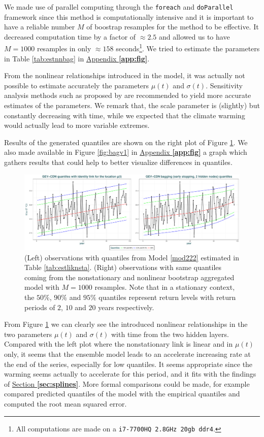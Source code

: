  We made use of parallel computing through the \texttt{foreach} and \texttt{doParallel} framework since this method is computationally intensive and it is important to have a reliable number $M$ of boostrap resamples for the method to be effective. It decreased computation time by a factor of $\approx 2.5$ and allowed us to have $M=1000$ resamples in only $\approx 158$ seconds\footnote{All computations are made on a \texttt{i7-7700HQ 2.8GHz 20gb ddr4}.}. We tried to estimate the parameters in Table \ref{tab:estnnbag} in \hyperref[app:fig]{Appendix \textbf{\ref{app:fig}}}.
 

 From the nonlinear relationships introduced in the model, it was actually not possible to estimate accurately the parameters $\mu(t)$ and $\sigma(t)$. Sensitivity analysis methods such as proposed by \citet{cannon_graph_2002} are recommended to yield more accurate estimates of the parameters.
 We remark that, the scale parameter is (slightly) but constantly decreasing with time, while we expected that the climate warming would actually lead to more variable extremes.
 
 Results of the generated quantiles are shown on the right plot of Figure \ref{fig:bag}. We also made available in Figure \ref{fig:bagv1} in  \hyperref[app:fig]{Appendix \textbf{\ref{app:fig}}} a graph which gathers results that could help to better visualize differences in quantiles. 
 
 \begin{figure}[!htb]
 	\centering	\includegraphics[width=1.01\linewidth]{gev_compv0.pdf}\caption{(Left) observations with quantiles from Model \ref{mod222} estimated in Table \ref{tab:estliknsta}. (Right) observations with same quantiles coming from the nonstationary and nonlinear bootstrap aggregated model with $M=1000$ resamples.
 	Note that in a stationary context, the $50\%$, $90\%$ and $95\%$ quantiles represent return levels with return periods of $2$, $10$ and $20$ years respectively.}\label{fig:bag}
 \end{figure}
 
From Figure \ref{fig:bag} we can clearly see the introduced nonlinear relationships in the two parameters $\mu(t)$ and $\sigma(t)$ with time from the two hidden layers. Compared with the left plot where the nonstationary link is linear and in $\mu(t)$ only, it seems that the ensemble model leads to an accelerate increasing rate at the end of the series, especially for low quantiles. It seems appropriate since the warming seems actually to accelerate for this period, and it fits with the findings of   \hyperref[sec:splines]{Section \textbf{\ref{sec:splines}}}. More formal comparisons could be made, for example \citet{cannon_flexible_2010} compared predicted quantiles  of the model with the empirical quantiles and computed the root mean squared error.


